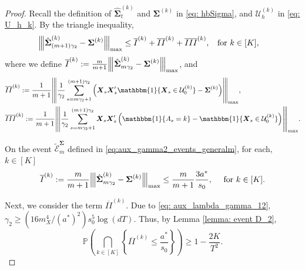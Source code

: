 \documentclass[aos,preprint]{imsart}
\theoremstyle{plain}
\theoremstyle{definition}
\newcommand{\idf}{\mathbbm{1}}
\newcommand{\bX}{\boldsymbol{X}}
\newcommand{\bSigma}{\boldsymbol{\Sigma}}
\newcommand{\op}[1]{{\left\vert\kern-0.25ex\left\vert\kern-0.25ex\left\vert #1\right\vert\kern-0.25ex\right\vert\kern-0.25ex\right\vert}}
\newcommand{\mE}{\mathcal{E}}
\newcommand{\hbSigma}{\hat{\boldsymbol{\Sigma}}}
\newcommand{\Pro}{\mathbb{P}}
\begin{document}
\begin{appendix}
\begin{proof}
Recall the definition of $\hbSigma_{t}^{(k)}$ and $\bSigma^{(k)}$ in \eqref{eq: hbSigma}, and $\mathcal{U}_h^{(k)}$ in \eqref{eq: U_h_k}. By the triangle inequality,
\begin{align}\label{aux:stage3_case_strategy}
    \op{\hbSigma_{(m+1)\gamma_2}^{(k)}-\bSigma^{(k)}}_{\textup{max}}&\le  \overline{I}^{(k)} + \overline{II}^{(k)} + \overline{III}^{(k)},\;\; \text{ for } k \in [K],
\end{align}
where we define $\overline{I}^{(k)} := \frac{m}{m+1} \op{\hbSigma_{m\gamma_2}^{(k)} -\bSigma^{(k)} }_{\textup{max}}$, and
\begin{align*}
&
    \overline{II}^{(k)} :=\frac{1}{m+1}\op{\frac{1}{\gamma_2}\sum_{s=m \gamma_2+1}^{(m+1)\gamma_2} \left(\bX_s\bX_s'\idf\{\bX_s \in\mathcal{U}_0^{(k)}\}-\bSigma^{(k)}\right)}_{\textup{max}},\\
    &\overline{III}^{(k)} := \frac{1}{m+1} \op{\frac{1}{\gamma_2}\sum_{s=m \gamma_2+1}^{(m+1)\gamma_2}\bX_s\bX_s'\left(\idf\{A_s=k\}-\idf\{\bX_s \in \mathcal{U}_0^{(k)}\}\right)}_{\textup{max}}.
\end{align*}

On the event $\tilde{\mE}_m^{\bSigma}$ defined in \eqref{eq:aux_gamma2_events_generalm}, for each, $k\in[K]$
\begin{equation} \label{aux:stage3_I}
  \overline{I}^{(k)} := \frac{m}{m+1} \op{\hbSigma_{m\gamma_2}^{(k)} -\bSigma^{(k)} }_{\textup{max}} \leq   \frac{m}{m+1}  \frac{3 a^*}{s_0}, \quad \text{ for } k \in [K].
\end{equation}

Next, we consider the term $\overline{II}^{(k)}$. Due to \eqref{eq: aux_lambda_gamma_12}, $\gamma_2  \geq (16m_X^4/(a^*)^2) s_0^5 \log(dT)$. Thus,  by  Lemma \ref{lemma: event D_2},
\begin{equation}\label{aux:stage3_II}
   \Pro\left( \bigcap_{k \in [K]} \left\{ \overline{II}^{(k)}  \le \frac{a^*}{s_0}\right\} \right) \geq 1 -\frac{2K}{T^2}.
\end{equation}


\end{proof}
\end{appendix}
\end{document}
